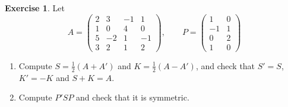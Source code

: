\documentclass[12pt]{article}
\theoremstyle{definition}
\newtheorem{exercise}{Exercise}
\begin{document}
\begin{exercise}\label{r1-dr-sym-skew}
Let
\[
A=\begin{pmatrix}2&3&-1&1\\1&0&4&0\\5&-2&1&-1\\3&2&1&2\end{pmatrix},\qquad
P=\begin{pmatrix}1&0\\-1&1\\0&2\\1&0\end{pmatrix}
\]
\begin{enumerate}
\item Compute \(S=\frac12(A+A')\) and \(K=\frac12(A-A')\), and check that \(S'=S\), \(K'=-K\) and \(S+K=A\).
\item Compute \(P'SP\) and check that it is symmetric.
\end{enumerate}
\end{exercise}
\end{document}
